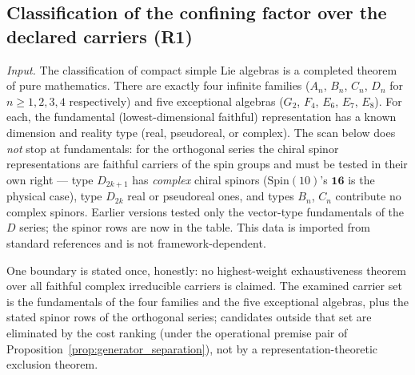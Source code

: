 \documentclass[11pt]{article}
\theoremstyle{definition}
\begin{document}
\subsection{Classification of the confining factor over the declared carriers (R1)}
\label{sec:R1_classification}

\noindent\textit{Input.}  The classification of compact simple Lie algebras
is a completed theorem of pure mathematics.  There are exactly four infinite
families ($A_n$, $B_n$, $C_n$, $D_n$ for $n \ge 1, 2, 3, 4$ respectively)
and five exceptional algebras ($G_2$, $F_4$, $E_6$, $E_7$, $E_8$).
For each, the fundamental (lowest-dimensional faithful) representation
has a known dimension and reality type (real, pseudoreal, or complex).
The scan below does \emph{not} stop at fundamentals: for the
orthogonal series the chiral spinor representations are faithful
carriers of the spin groups and must be tested in their own right ---
type $D_{2k+1}$ has \emph{complex} chiral spinors
($\mathrm{Spin}(10)$'s $\mathbf{16}$ is the physical case), type
$D_{2k}$ real or pseudoreal ones, and types $B_n$, $C_n$ contribute no
complex spinors.  Earlier versions tested only the vector-type
fundamentals of the $D$ series; the spinor rows are now in the table.
This data is imported from standard references
\cite{Humphreys1972,FultonHarris1991} and is not framework-dependent.

One boundary is stated once, honestly: no highest-weight
exhaustiveness theorem over all faithful complex irreducible carriers
is claimed.  The examined carrier set is the fundamentals of the four
families and the five exceptional algebras, plus the stated spinor
rows of the orthogonal series; candidates outside that set are
eliminated by the cost ranking (under the operational premise pair of
Proposition~\ref{prop:generator_separation}), not by a
representation-theoretic exclusion theorem.
\end{document}
